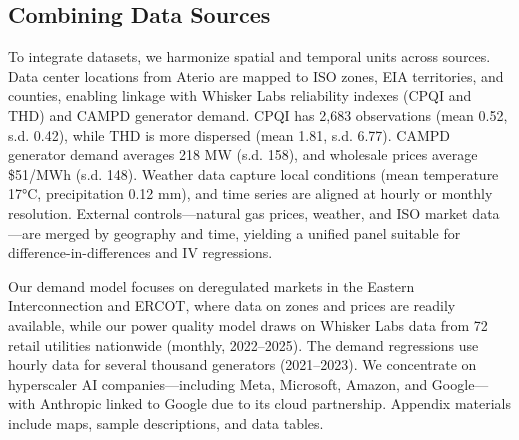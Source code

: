 \documentclass[sigconf,authordraft]{acmart}
\begin{document}
\subsection{Combining Data Sources}

To integrate datasets, we harmonize spatial and temporal units across sources. Data center locations from Aterio are mapped to ISO zones, EIA territories, and counties, enabling linkage with Whisker Labs reliability indexes (CPQI and THD) and CAMPD generator demand. CPQI has 2,683 observations (mean 0.52, s.d. 0.42), while THD is more dispersed (mean 1.81, s.d. 6.77). CAMPD generator demand averages 218 MW (s.d. 158), and wholesale prices average \$51/MWh (s.d. 148). Weather data capture local conditions (mean temperature 17°C, precipitation 0.12 mm), and time series are aligned at hourly or monthly resolution. External controls—natural gas prices, weather, and ISO market data—are merged by geography and time, yielding a unified panel suitable for difference-in-differences and IV regressions.

Our demand model focuses on deregulated markets in the Eastern Interconnection and ERCOT, where data on zones and prices are readily available, while our power quality model draws on Whisker Labs data from 72 retail utilities nationwide (monthly, 2022–2025). The demand regressions use hourly data for several thousand generators (2021–2023). We concentrate on hyperscaler AI companies—including Meta, Microsoft, Amazon, and Google—with Anthropic linked to Google due to its cloud partnership. Appendix materials include maps, sample descriptions, and data tables.
\end{document}
